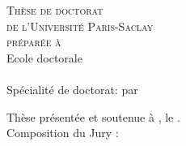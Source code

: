 \vspace{6cm}
\color{blue!20!red!45!black} %
  \begin{center}    
    \LARGE\textsc{Thèse de doctorat\\ de l'Université Paris-Saclay} \\
    \LARGE{\textsc{préparée à \PhDworkingplace}} \\ \bigskip
  \color{black} %
	\vfill
    \Large{Ecole doctorale \no \ecodocnum}\\ %
     \Large{\ecodoctitle}  \\

     \Large{Spécialité de doctorat: \PhDspeciality} %
    \vfill  
   \Large{par}
   \vfill
   \LARGE{\textbf{\textsc{\PhDname}}} %
    \vfill
    \Large{\PhDTitleFR} %
    \vfill
    \bigskip
\end{center}
\color{black}
\begin{flushleft}
Thèse présentée et soutenue à , le . \\
\bigskip
Composition du Jury :
\end{flushleft}

